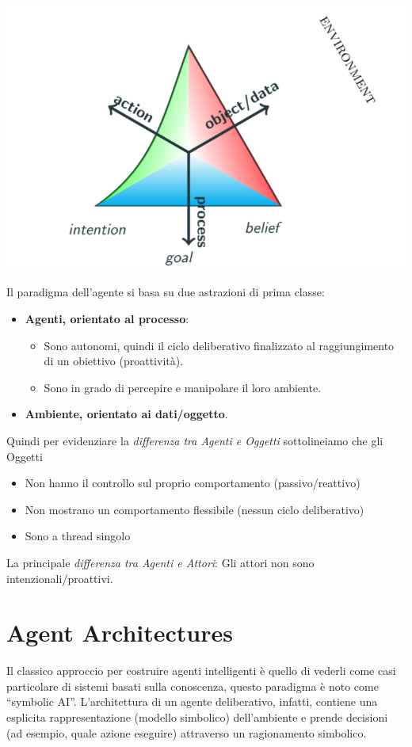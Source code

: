 \begin{center}
    \includegraphics[scale=0.4]{images/triangolo di meyer AOP.PNG}
\end{center}
Il paradigma dell'agente si basa su due astrazioni di prima classe:
\begin{itemize}
    \item \textbf{Agenti, orientato al processo}:
        \begin{itemize}
            \item Sono autonomi, quindi il ciclo deliberativo finalizzato al raggiungimento di un obiettivo (proattività).
            \item Sono in grado di percepire e manipolare il loro ambiente.
        \end{itemize}
    \item \textbf{Ambiente, orientato ai dati/oggetto}.
\end{itemize}
Quindi per evidenziare la \textit{differenza tra Agenti e Oggetti} sottolineiamo che gli Oggetti
\begin{itemize}
    \item Non hanno il controllo sul proprio comportamento (passivo/reattivo)
    \item Non mostrano un comportamento flessibile (nessun ciclo deliberativo)
    \item Sono a thread singolo
\end{itemize}
La principale \textit{differenza tra Agenti e Attori}: Gli attori non sono intenzionali/proattivi.

\newpage

\section{Agent Architectures}
Il classico approccio per costruire agenti intelligenti è quello di vederli come casi particolare di sistemi basati sulla conoscenza, questo paradigma è noto come “symbolic AI”. 
L'architettura di un agente deliberativo, infatti, contiene una esplicita rappresentazione (modello simbolico) dell’ambiente e prende decisioni (ad esempio, quale azione eseguire) attraverso un ragionamento simbolico.

